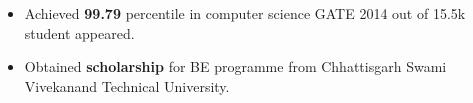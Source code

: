 \\[-0.8cm]\\
\begin{itemize}
	\item Achieved \textbf{99.79} percentile in computer science GATE 2014 out of 15.5k student appeared.\\[-0.4cm]
	\item Obtained \textbf{scholarship} for BE programme from Chhattisgarh Swami Vivekanand Technical University.\\[-0.4cm]
\end{itemize}
